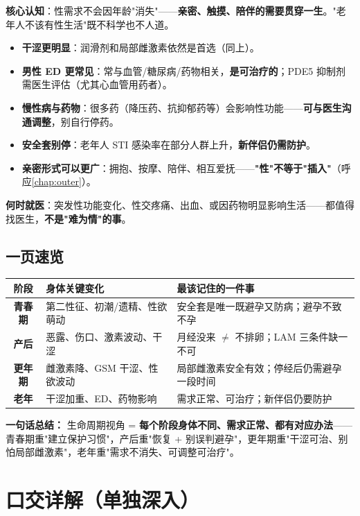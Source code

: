 \textbf{核心认知}：性需求不会因年龄"消失"——\textbf{亲密、触摸、陪伴的需要贯穿一生}。"老年人不该有性生活"既不科学也不人道。

\begin{itemize}[leftmargin=2em,itemsep=0.3em]
  \item \textbf{干涩更明显}：润滑剂和局部雌激素依然是首选（同上）。
  \item \textbf{男性 ED 更常见}：常与血管/糖尿病/药物相关，\textbf{是可治疗的}；PDE5 抑制剂需医生评估（尤其心血管用药者）。
  \item \textbf{慢性病与药物}：很多药（降压药、抗抑郁药等）会影响性功能——\textbf{可与医生沟通调整}，别自行停药。
  \item \textbf{安全套别停}：老年人 STI 感染率在部分人群上升，\textbf{新伴侣仍需防护}。
  \item \textbf{亲密形式可以更广}：拥抱、按摩、陪伴、相互爱抚——\textbf{"性"不等于"插入"}（呼应\ref{chap:outer}）。
\end{itemize}

\textbf{何时就医}：突发性功能变化、性交疼痛、出血、或因药物明显影响生活——都值得找医生，\textbf{不是"难为情"的事}。

\section{一页速览}

\begin{tabularx}{\linewidth}{C X X}
\toprule
\textbf{阶段} & \textbf{身体关键变化} & \textbf{最该记住的一件事} \\
\midrule
\textbf{青春期} & 第二性征、初潮/遗精、性欲萌动 & 安全套是唯一既避孕又防病；避孕不致不孕 \\
\textbf{产后} & 恶露、伤口、激素波动、干涩 & 月经没来 $\ne$ 不排卵；LAM 三条件缺一不可 \\
\textbf{更年期} & 雌激素降、GSM 干涩、性欲波动 & 局部雌激素安全有效；停经后仍需避孕一段时间 \\
\textbf{老年} & 干涩加重、ED、药物影响 & 需求正常、可治疗；新伴侣仍要防护 \\
\bottomrule
\end{tabularx}

\vspace{1em}
\noindent\textbf{一句话总结：} 生命周期视角 = \textbf{每个阶段身体不同、需求正常、都有对应办法}——青春期重"建立保护习惯"，产后重"恢复 + 别误判避孕"，更年期重"干涩可治、别怕局部雌激素"，老年重"需求不消失、可调整可治疗"。

\chapter{口交详解（单独深入）}
\label{chap:oral}

